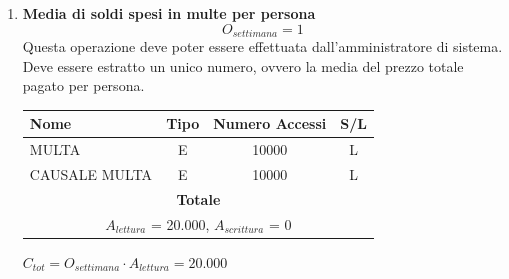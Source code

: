 \documentclass[12pt,a4paper]{report}
\begin{document}
\begin{enumerate}[label=\textbf{\arabic*)}]
         \item\textbf{Media di soldi spesi in multe per persona} \label{op16} \\
	\[{O_{settimana} = 1}\]
	Questa operazione deve poter essere effettuata dall'amministratore di sistema.\\
	Deve essere estratto un unico numero, ovvero la media del prezzo totale pagato per persona.
	\begin{table}[H]
	\centering
	\begin{tabular}{|l|c|c|c|}
	\hline
	Nome & Tipo & Numero Accessi & S/L \\
	\hline
	MULTA & E & 10000 & L \\
	\hline
	CAUSALE MULTA & E & 10000 & L \\
	    \hline
	    \multicolumn{4}{c}{\textbf{Totale}} \\
	    \multicolumn{4}{c}{${A_{lettura}}$ = 20.000, ${A_{scrittura}}$ = 0} \\
	    \hline
	    \end{tabular}
	    \end{table}
	    \begin{center}
	    ${C_{tot} = {O_{settimana}}\cdot{A_{lettura}}= 20.000}$
	    \end{center}



\end{enumerate}
\end{document}
